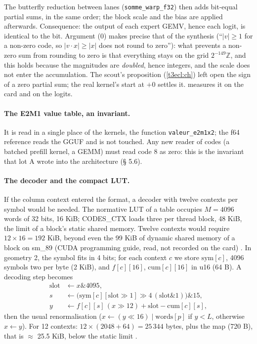 The butterfly reduction between lanes (\texttt{somme\_warp\_f32}) then adds bit-equal partial sums, in the same order; the block scale and the bias are applied afterwards. Consequence: the output of each expert GEMV, hence each logit, is identical to the bit. Argument (0) makes precise that of the synthesis (``$|v| \ge 1$ for a non-zero code, so $|v\cdot x| \ge |x|$ does not round to zero''): what prevents a non-zero sum from rounding to zero is that everything stays on the grid $2^{-149}\mathbb{Z}$, and this holds because the magnitudes are \emph{doubled}, hence integers, and the scale does not enter the accumulation. The scout's proposition (\cref{t3ecl:ch}) left open the sign of a zero partial sum; the real kernel's start at $+0$ settles it.  measures it on the card and on the logits.

\paragraph{The E2M1 value table, an invariant.} It is read in a single place of the kernels, the function \texttt{valeur\_\allowbreak e2m1x2}; the f64 reference reads the GGUF and is not touched. Any new reader of codes (a batched prefill kernel, a GEMM) must read code 8 as zero: this is the invariant that lot A wrote into the architecture (§ 5.6).

\paragraph{The decoder and the compact LUT.} If the column context entered the format, a decoder with twelve contexts per symbol would be needed. The normative LUT of a table occupies $M = \num{4096}$ words of 32 bits, 16 KiB; CODES\_CTX loads three per thread block, 48 KiB, the limit of a block's static shared memory. Twelve contexts would require $12 \times 16 = 192$ KiB, beyond even the 99 KiB of dynamic shared memory of a block on sm\_89 (CUDA programming guide, read, not recorded on the card) \litt. In geometry 2, the symbol fits in 4 bits; for each context $c$ we store $\mathrm{sym}[c]$, \num{4096} symbols two per byte (2 KiB), and $f[c][16]$, $\mathrm{cum}[c][16]$ in u16 (64 B). A decoding step becomes
\begin{align*}
\text{slot} &\leftarrow x \mathbin{\&} 4095,\\
s &\leftarrow \bigl(\mathrm{sym}[c][\text{slot} \gg 1] \gg 4\,(\text{slot} \mathbin{\&} 1)\bigr) \mathbin{\&} 15,\\
y &\leftarrow f[c][s]\,(x \gg 12) + \text{slot} - \mathrm{cum}[c][s],
\end{align*}
then the usual renormalisation ($x \leftarrow (y \ll 16) \mid \text{words}[p]$ if $y < L$, otherwise $x \leftarrow y$). For 12 contexts: $12 \times (2048 + 64) = 25\,344$ bytes, plus the map (720 B), that is $\approx$ 25.5 KiB, below the static limit \calc.

